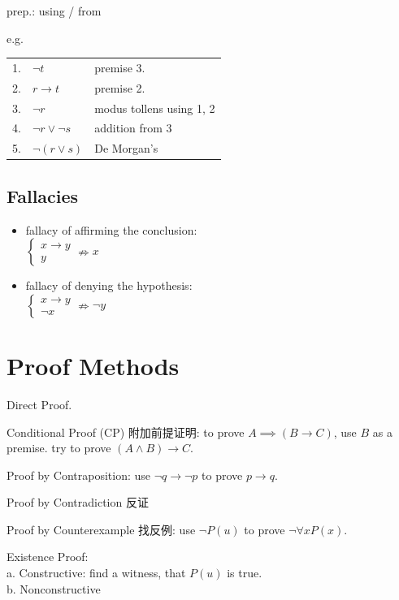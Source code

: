 \documentclass[12pt, a4paper, UTF8, openany]{ctexbook}
\begin{document}
        prep.: using / from

        e.g.
        \begin{longtable}[h]{l l l}
            1. & $\lnot t$ & premise 3. \\
            2. & $r \to t$ & premise 2. \\
            3. & $\lnot r$ & modus tollens using 1, 2 \\
            4. & $\lnot r \lor \lnot s$ & addition from 3 \\
            5. & $\lnot (r \lor s)$ & De Morgan's
        \end{longtable}

        \subsection{Fallacies}
        \begin{itemize}
            \item fallacy of affirming the conclusion: \\
                $\begin{cases}
                    x \to y \\ y
                \end{cases} \nRightarrow  x$
            \item fallacy of denying the hypothesis: \\
                $\begin{cases}
                    x \to y \\ \lnot x
                \end{cases} \nRightarrow  \lnot y$
        \end{itemize}

    \section{Proof Methods}
    Direct Proof.

    Conditional Proof (CP) 附加前提证明: to prove $A \implies (B \to C)$, use $B$ as a premise. 
    try to prove $(A \land B) \to C$.

    Proof by Contraposition: use $\lnot q \to \lnot p$ to prove $p \to q$.

    Proof by Contradiction 反证

    Proof by Counterexample 找反例: use $\lnot P(u)$ to prove $\lnot \forall xP(x)$.

    Existence Proof: \\
    a. Constructive: find a witness, that $P(u)$ is true. \\
    b. Nonconstructive
\end{document}
